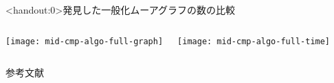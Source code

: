 \begin{frame}<handout:0>{発見した一般化ムーアグラフの数の比較}
  \begin{columns}
    \begin{minipage}[t]{.5\textwidth}
      \centering
      \texttt{[image: mid-cmp-algo-full-graph]}
      \label{fig:full-graph}
    \end{minipage}
    \hspace{1ex}
    \begin{minipage}[t]{.5\textwidth}
      \centering
      \texttt{[image: mid-cmp-algo-full-time]}
      \label{fig:full-time}
    \end{minipage}
  \end{columns}
\end{frame}

\begin{frame}[allowframebreaks]{参考文献}
  
\end{frame}

